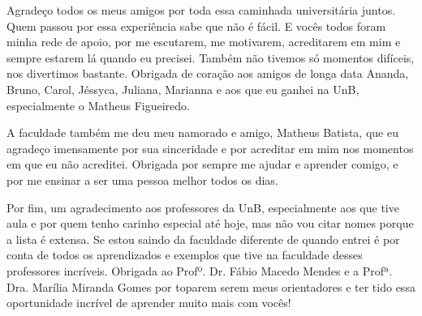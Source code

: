 \begin{agradecimentos}
Agradeço todos os meus amigos por toda essa caminhada universitária juntos. Quem passou por essa experiência sabe que não é fácil. E vocês todos foram minha rede de apoio, por me escutarem, me motivarem, acreditarem em mim e sempre estarem lá quando eu precisei. Também não tivemos só momentos difíceis, nos divertimos bastante. Obrigada de coração aos amigos de longa data Ananda, Bruno, Carol, Jéssyca, Juliana, Marianna e aos que eu ganhei na UnB, especialmente o Matheus Figueiredo. 

A faculdade também me deu meu namorado e amigo, Matheus Batista, que eu agradeço imensamente por sua sinceridade e por acreditar em mim nos momentos em que eu não acreditei. Obrigada por sempre me ajudar e aprender comigo, e por me ensinar a ser uma pessoa melhor todos os dias. 


Por fim, um agradecimento aos professores da UnB, especialmente aos que tive aula e por quem tenho carinho especial até hoje, mas não vou citar nomes porque a lista é extensa. Se estou saindo da faculdade diferente de quando entrei é por conta de todos os aprendizados e exemplos que tive na faculdade desses professores incríveis. Obrigada ao Profº. Dr. Fábio Macedo Mendes e a Profª. Dra. Marília Miranda Gomes por toparem serem meus orientadores e ter tido essa oportunidade incrível de aprender muito mais com vocês!










\end{agradecimentos}
